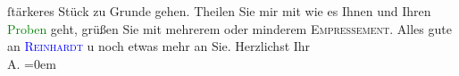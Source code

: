                ſtärkeres Stück zu Grunde gehen.\pend
           \pstart
           Theilen Sie mir mit wie es Ihnen und Ihren \textcolor{green}{Proben}{} geht, grüßen Sie mit mehrerem oder minderem \textsc{Empressement}.\pend
           \pstart
           Alles gute an \textcolor{blue}{\textsc{Reinhardt}}{}\ledrightnote{\textcolor{blue}{Max Reinhardt}} u noch etwas mehr an Sie.\pend
           \pstart
           Herzlichst Ihr{\\[\baselineskip]}\spacefill\mbox{A.}\pend
           \leftskip=0em{}\endnumbering{}  
      